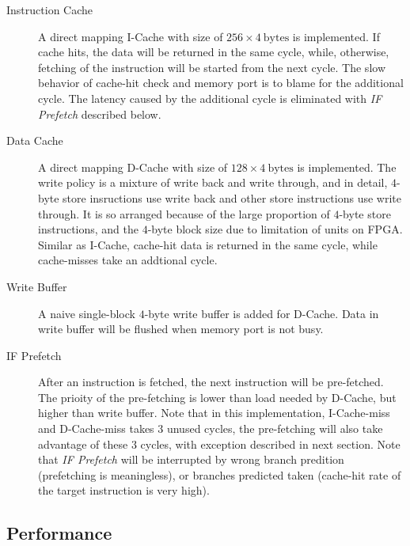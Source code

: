 \documentclass{article}
\begin{document}
            \begin{description}
                \item[Instruction Cache]
                    A direct mapping I-Cache with size of $256 \times 4~\mathrm{bytes}$ is implemented.
                    If cache hits, the data will be returned in the same cycle,
                    while, otherwise, fetching of the instruction will be started from the next cycle.
                    The slow behavior of cache-hit check and memory port is to blame for the additional cycle.
                    The latency caused by the additional cycle is eliminated with \textit{IF Prefetch} described below.
                \item[Data Cache]
                    A direct mapping D-Cache with size of $128 \times 4~\mathrm{bytes}$ is implemented.
                    The write policy is a mixture of write back and write through,
                    and in detail, $4$-byte store insructions use write back and other store instructions use write through.
                    It is so arranged because of the large proportion of $4$-byte store instructions,
                    and the $4$-byte block size due to limitation of units on FPGA.
                    Similar as I-Cache, cache-hit data is returned in the same cycle, while cache-misses take an addtional cycle.
                \item[Write Buffer]
                    A naive single-block $4$-byte write buffer is added for D-Cache.
                    Data in write buffer will be flushed when memory port is not busy.
                \item[IF Prefetch]
                    After an instruction is fetched, the next instruction will be pre-fetched.
                    The prioity of the pre-fetching is lower than load needed by D-Cache, but higher than write buffer.
                    Note that in this implementation, I-Cache-miss and D-Cache-miss takes $3$ unused cycles,
                    the pre-fetching will also take advantage of these $3$ cycles, with exception described in next section.
                    Note that \textit{IF Prefetch} will be interrupted by wrong branch predition (prefetching is meaningless),
                    or branches predicted taken (cache-hit rate of the target instruction is very high).
            \end{description}

        \subsection{Performance}
            
\end{document}

